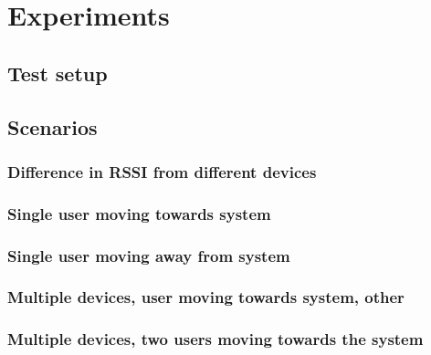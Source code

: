 \section{Experiments}

\subsection{Test setup}

\subsection{Scenarios}

\subsubsection{Difference in RSSI from different devices}

\subsubsection{Single user moving towards system}

\subsubsection{Single user moving away from system}

\subsubsection{Multiple devices, user moving towards system, other}

\subsubsection{Multiple devices, two users moving towards the system}
